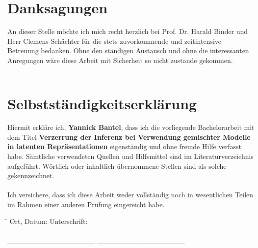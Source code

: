 \documentclass[%
thesis=student,%
coverpage=false,%
titlepage=false,%
headmarks=true, %
german,%
font=libertine, %
math=newpxtx, %
BCOR=5mm,%
coverBCOR=11mm%
]{tumbook}
\theoremstyle{break}
\begin{document}
\chapter{Danksagungen}
An dieser Stelle möchte ich mich recht herzlich bei Prof. Dr. Harald Binder und Herr Clemens Schächter für die stets zuvorkommende und zeitintensive Betreuung bedanken. Ohne den ständigen Austausch und ohne die interessanten Anregungen wäre diese Arbeit mit Sicherheit so nicht zustande gekommen.\\
\\
\newpage
\chapter{Selbstständigkeitserklärung}
Hiermit erkläre ich, \textbf{Yannick Bantel}, dass ich die vorliegende Bachelorarbeit mit dem Titel \textbf{Verzerrung der Inferenz bei Verwendung gemischter Modelle in latenten Repräsentationen} eigenständig und ohne fremde Hilfe verfasst habe. Sämtliche verwendeten Quellen und Hilfsmittel sind im Literaturverzeichnis aufgeführt. Wörtlich oder inhaltlich übernommene Stellen sind als solche gekennzeichnet.\\
\\
Ich versichere, dass ich diese Arbeit weder vollständig noch in wesentlichen Teilen im Rahmen einer anderen Prüfung eingereicht habe.\\

\vspace{2cm}

\begin{flushleft}
	\begin{tabbing}
		\hspace{8cm} \= \hspace{4cm} \kill
		Ort, Datum: \> Unterschrift: \\
		\\
		\_\_\_\_\_\_\_\_\_\_\_\_\_\_\_\_\_ \> \_\_\_\_\_\_\_\_\_\_\_\_\_\_\_\_\_
	\end{tabbing}
\end{flushleft}
\newpage
\printbibliography{} 
\end{document}
